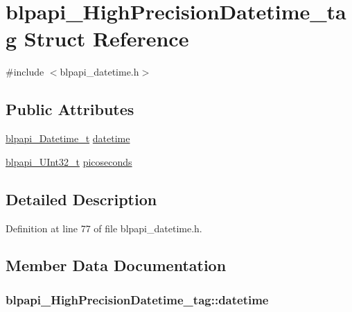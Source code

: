 \hypertarget{structblpapi___high_precision_datetime__tag}{}\section{blpapi\+\_\+\+High\+Precision\+Datetime\+\_\+tag Struct Reference}
\label{structblpapi___high_precision_datetime__tag}


{\ttfamily \#include $<$blpapi\+\_\+datetime.\+h$>$}

\subsection*{Public Attributes}
\begin{DoxyCompactItemize}
\item 
\hyperlink{blpapi__datetime_8h_aa182a01a276451f8c8aa7c425c9f1552}{blpapi\+\_\+\+Datetime\+\_\+t} \hyperlink{structblpapi___high_precision_datetime__tag_ac8e543f244f5dec0d090d5b7528465d6}{datetime}
\item 
\hyperlink{blpapi__types_8h_ac521650ce22d9079f3d0da5e0acdf650}{blpapi\+\_\+\+U\+Int32\+\_\+t} \hyperlink{structblpapi___high_precision_datetime__tag_a06e6cef288d60fd91fff08f6fadc3c75}{picoseconds}
\end{DoxyCompactItemize}


\subsection{Detailed Description}


Definition at line 77 of file blpapi\+\_\+datetime.\+h.



\subsection{Member Data Documentation}
\subsubsection[{\texorpdfstring{datetime}{datetime}}]{ blpapi\+\_\+\+High\+Precision\+Datetime\+\_\+tag\+::datetime}\hypertarget{structblpapi___high_precision_datetime__tag_ac8e543f244f5dec0d090d5b7528465d6}{}\label{structblpapi___high_precision_datetime__tag_ac8e543f244f5dec0d090d5b7528465d6}


